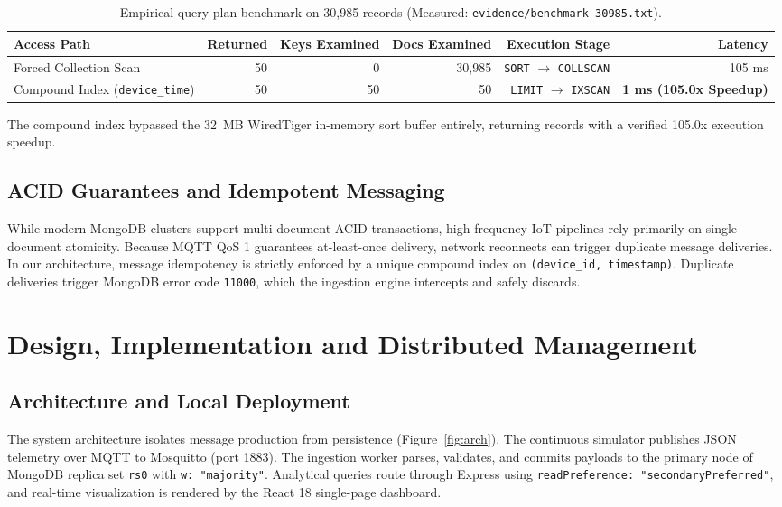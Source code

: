 \documentclass[11pt,a4paper]{article}
\begin{document}
\begin{table}[htbp]
\centering\small
\caption{Empirical query plan benchmark on 30,985 records (Measured: \texttt{evidence/benchmark-30985.txt}).}\label{tab:bench}
\begin{tabularx}{\textwidth}{@{}l r r r r r@{}}
\toprule
Access Path & Returned & Keys Examined & Docs Examined & Execution Stage & Latency\\
\midrule
Forced Collection Scan & 50 & 0 & 30,985 & \texttt{SORT} $\to$ \texttt{COLLSCAN} & 105 ms\\
Compound Index (\texttt{device\_time}) & 50 & 50 & 50 & \texttt{LIMIT} $\to$ \texttt{IXSCAN} & \textbf{1 ms (105.0x Speedup)}\\
\bottomrule
\end{tabularx}
\end{table}

The compound index bypassed the 32~MB WiredTiger in-memory sort buffer entirely, returning records with a verified 105.0x execution speedup.

\subsection{ACID Guarantees and Idempotent Messaging}
While modern MongoDB clusters support multi-document ACID transactions, high-frequency IoT pipelines rely primarily on single-document atomicity. Because MQTT QoS 1 guarantees at-least-once delivery, network reconnects can trigger duplicate message deliveries. In our architecture, message idempotency is strictly enforced by a unique compound index on \texttt{(device\_id, timestamp)}. Duplicate deliveries trigger MongoDB error code \texttt{11000}, which the ingestion engine intercepts and safely discards.

\section{Design, Implementation and Distributed Management}

\subsection{Architecture and Local Deployment}
The system architecture isolates message production from persistence (Figure~\ref{fig:arch}). The continuous simulator publishes JSON telemetry over MQTT to Mosquitto (port 1883). The ingestion worker parses, validates, and commits payloads to the primary node of MongoDB replica set \texttt{rs0} with \texttt{w: "majority"}. Analytical queries route through Express using \texttt{readPreference: "secondaryPreferred"}, and real-time visualization is rendered by the React 18 single-page dashboard.
\end{document}
